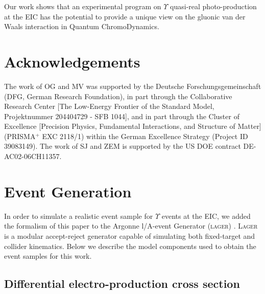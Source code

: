 \documentclass[prd,amsmath,%
twocolumn,floatfix,amssymb, preprintnumbers, linenumbers,nofootinbib, superscriptaddress]{revtex4}
\begin{document}
Our work shows that an experimental program on $\Upsilon$ quasi-real photo-production at the EIC has the potential to provide a unique view on the gluonic van der Waals interaction in Quantum ChromoDynamics.   




\section*{Acknowledgements}
The work of OG and MV was supported by the Deutsche Forschungsgemeinschaft (DFG, German Research Foundation),
in part through the Collaborative Research Center [The Low-Energy Frontier of the Standard
Model, Projektnummer 204404729 - SFB 1044], and in part through the Cluster of Excellence
[Precision Physics, Fundamental Interactions, and Structure of Matter] (PRISMA$^+$ EXC
2118/1) within the German Excellence Strategy (Project ID 39083149).
The work of SJ and ZEM is supported by the US DOE contract DE-AC02-06CH11357.



\appendix

\section{Event Generation\label{apx-evgen}}
In order to simulate a realistic event sample for $\Upsilon$ events at the EIC,
we added the formalism of this paper to the Argonne l/A-event Generator (\textsc{lager}) \cite{git:lager}.
\textsc{Lager} is a modular accept-reject generator capable of simulating both fixed-target and collider kinematics. Below we describe the model components used to obtain the event samples for this work.

\subsection{Differential electro-production cross section}
\end{document}
